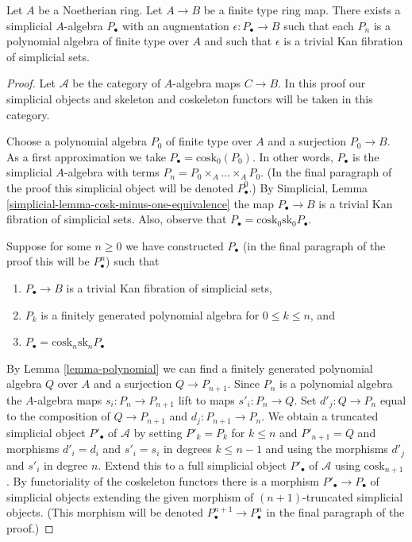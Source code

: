 \begin{proposition}
\label{proposition-polynomial}
Let $A$ be a Noetherian ring. Let $A \to B$ be a finite type ring map.
There exists a simplicial $A$-algebra $P_\bullet$ with an augmentation
$\epsilon : P_\bullet \to B$ such that each $P_n$ is a polynomial algebra
of finite type over $A$ and such that $\epsilon$ is a trivial
Kan fibration of simplicial sets.
\end{proposition}

\begin{proof}
Let $\mathcal{A}$ be the category of $A$-algebra maps $C \to B$.
In this proof our simplicial objects and skeleton and coskeleton
functors will be taken in this category.

\medskip\noindent
Choose a polynomial algebra $P_0$ of finite type over $A$ and a surjection
$P_0 \to B$. As a first approximation we take
$P_\bullet = \text{cosk}_0(P_0)$. In other words, $P_\bullet$ is the simplicial
$A$-algebra with terms $P_n = P_0 \times_A \ldots \times_A P_0$.
(In the final paragraph of the proof this simplicial object will
be denoted $P^0_\bullet$.) By
Simplicial, Lemma \ref{simplicial-lemma-cosk-minus-one-equivalence}
the map $P_\bullet \to B$ is a trivial Kan fibration of simplicial sets.
Also, observe that $P_\bullet = \text{cosk}_0 \text{sk}_0 P_\bullet$.

\medskip\noindent
Suppose for some $n \geq 0$ we have constructed $P_\bullet$
(in the final paragraph of the proof this will be $P^n_\bullet$)
such that
\begin{enumerate}
\item[(a)] $P_\bullet \to B$ is a trivial Kan fibration of simplicial sets,
\item[(b)] $P_k$ is a finitely generated polynomial algebra for
$0 \leq k \leq n$, and
\item[(c)] $P_\bullet = \text{cosk}_n \text{sk}_n P_\bullet$
\end{enumerate}
By Lemma \ref{lemma-polynomial}
we can find a finitely generated polynomial algebra $Q$ over $A$
and a surjection $Q \to P_{n + 1}$. Since $P_n$ is a polynomial algebra
the $A$-algebra maps $s_i : P_n \to P_{n + 1}$ lift to maps
$s'_i : P_n \to Q$. Set $d'_j : Q \to P_n$ equal to the composition of
$Q \to P_{n + 1}$ and $d_j : P_{n + 1} \to P_n$.
We obtain a truncated simplicial object $P'_\bullet$ of $\mathcal{A}$
by setting $P'_k = P_k$ for $k \leq n$ and $P'_{n + 1} = Q$ and morphisms
$d'_i = d_i$ and $s'_i = s_i$ in degrees $k \leq n - 1$ and using the
morphisms $d'_j$ and $s'_i$ in degree $n$. Extend this to a full simplicial
object $P'_\bullet$ of $\mathcal{A}$ using $\text{cosk}_{n + 1}$. By
functoriality of the coskeleton functors there is a morphism
$P'_\bullet \to P_\bullet$ of simplicial objects extending the
given morphism of $(n + 1)$-truncated simplicial objects.
(This morphism will be denoted $P^{n + 1}_\bullet \to P^n_\bullet$
in the final paragraph of the proof.)


\end{proof}
